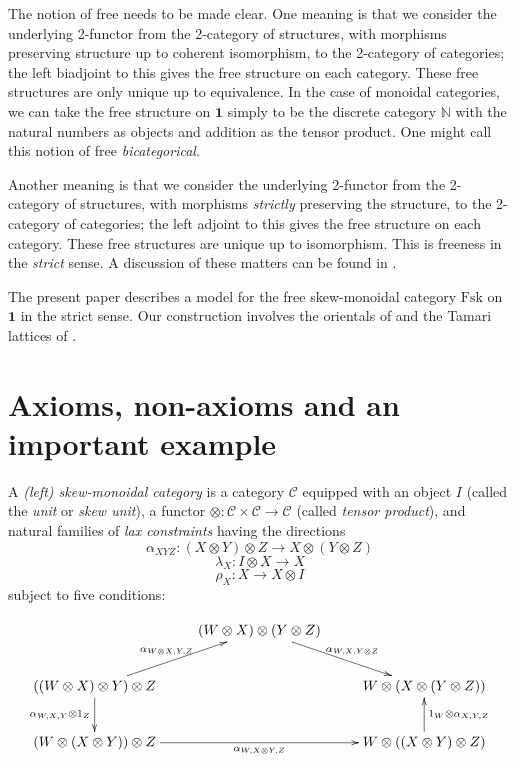 \documentclass[a4paper,12pt,reqno]{amsart}
\theoremstyle{definition}
\theoremstyle{fact}
\theoremstyle{genquest}
\theoremstyle{step}
\newcommand{\lra}{\longrightarrow}
\def\CC{{\mathscr C}}
\begin{document}
The notion of free needs to be made clear. One meaning is that we consider the underlying 2-functor from the 
2-category of structures, with morphisms preserving structure up to coherent isomorphism, to the 2-category of categories;
the left biadjoint to this gives the free structure on each category. These free structures are only unique up to equivalence.
In the case of monoidal categories, we can take the free structure on $\mathbf{1}$ simply to be the discrete category $\mathbb{N}$
with the natural numbers as objects and addition as the tensor product. One might call this notion of free {\em bicategorical}.   

Another meaning is that we consider the underlying 2-functor from the 2-category of structures, with morphisms {\em strictly}
preserving the structure, to the 2-category of categories; the left adjoint to this gives the free structure on each category. 
These free structures are unique up to isomorphism. This is freeness in the {\em strict} sense. A discussion of these matters can be found in \cite{btc}.

The present paper describes a model for the free skew-monoidal category $\mathrm{Fsk}$ on $\mathbf{1}$ in the strict sense.
Our construction involves the orientals of \cite{aos} and the Tamari lattices of \cite{HT}.

\section{Axioms, non-axioms and an important example}

A {\em (left) skew-monoidal category} is a category $\CC$ equipped with an object $I$ (called the {\em unit} or {\em skew unit}),
a functor $\otimes : \CC \times \CC \lra \CC$ (called {\em tensor product}), and
natural families of {\em lax constraints} having the directions 
\begin{equation}
\alpha_{XYZ} : (X\otimes Y)\otimes Z \lra X\otimes (Y\otimes Z)
\end{equation}
\begin{equation}
\lambda_X : I\otimes X \lra X
\end{equation}
\begin{equation}
\rho_X :  X \lra X\otimes I
\end{equation}
subject to five conditions: 

\begin{equation}\label{pentagon}
\xymatrix{
& (W\otimes X)\otimes (Y\otimes Z) \ar[rd]^-{{\alpha_{W,X,Y\otimes Z}}}  & \\
((W\otimes X)\otimes Y)\otimes Z \ar[ru]^-{{\alpha_{W\otimes X,Y,Z}}} \ar[d]_-{{\alpha_{W,X,Y}} \otimes 1_Z} & & W\otimes (X\otimes (Y\otimes Z))  \\
(W\otimes (X\otimes Y))\otimes Z \ar[rr]_-{{\alpha_{W,X\otimes Y,Z}}} & & W\otimes ((X\otimes Y)\otimes Z) \ar[u]_-{1_W\otimes {\alpha_{X, Y,Z}}} }
\end{equation}
\end{document}
